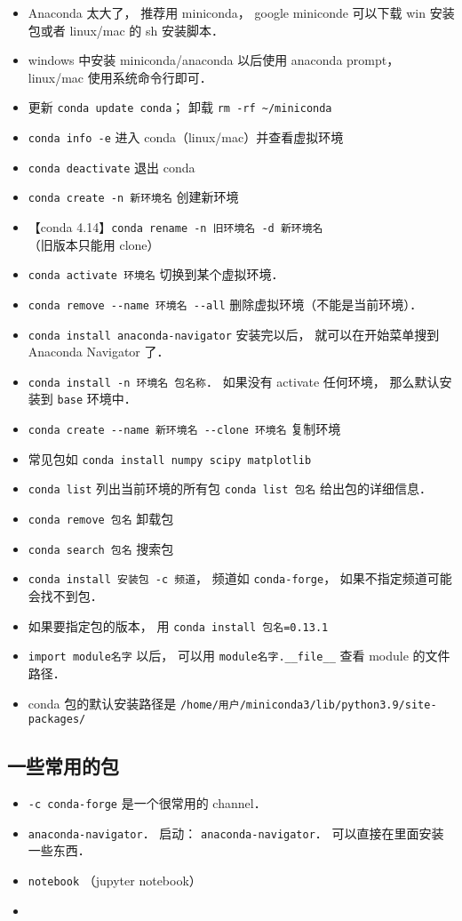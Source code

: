 
\begin{itemize}
\item Anaconda 太大了， 推荐用 miniconda， google miniconde 可以下载 win 安装包或者 linux/mac 的 sh 安装脚本．
\item windows 中安装 miniconda/anaconda 以后使用 anaconda prompt， linux/mac 使用系统命令行即可．
\item 更新 \verb|conda update conda|； 卸载 \verb|rm -rf ~/miniconda|
\item \verb|conda info -e| 进入 conda（linux/mac）并查看虚拟环境
\item \verb|conda deactivate| 退出 conda
\item \verb|conda create -n 新环境名| 创建新环境
\item 【conda 4.14】\verb|conda rename -n 旧环境名 -d 新环境名| （旧版本只能用 clone）
\item \verb|conda activate 环境名| 切换到某个虚拟环境．
\item \verb|conda remove --name 环境名 --all| 删除虚拟环境（不能是当前环境）．
\item \verb|conda install anaconda-navigator| 安装完以后， 就可以在开始菜单搜到 Anaconda Navigator 了．
\item \verb|conda install -n 环境名 包名称|． 如果没有 activate 任何环境， 那么默认安装到 \verb|base| 环境中．
\item \verb|conda create --name 新环境名 --clone 环境名| 复制环境
\item 常见包如 \verb|conda install numpy scipy matplotlib|
\item \verb|conda list| 列出当前环境的所有包 \verb|conda list 包名| 给出包的详细信息．
\item \verb|conda remove 包名| 卸载包
\item \verb|conda search 包名| 搜索包
\item \verb|conda install 安装包 -c 频道|， 频道如 \verb|conda-forge|， 如果不指定频道可能会找不到包．
\item 如果要指定包的版本， 用 \verb|conda install 包名=0.13.1|
\item \verb|import module名字| 以后， 可以用 \verb|module名字.__file__| 查看 module 的文件路径．
\item conda 包的默认安装路径是 \verb|/home/用户/miniconda3/lib/python3.9/site-packages/|
\end{itemize}

\subsection{一些常用的包}
\begin{itemize}
\item \verb|-c conda-forge| 是一个很常用的 channel．
\item \verb|anaconda-navigator|． 启动： \verb|anaconda-navigator|． 可以直接在里面安装一些东西．
\item \verb|notebook| （jupyter notebook）
\item 
\end{itemize}
